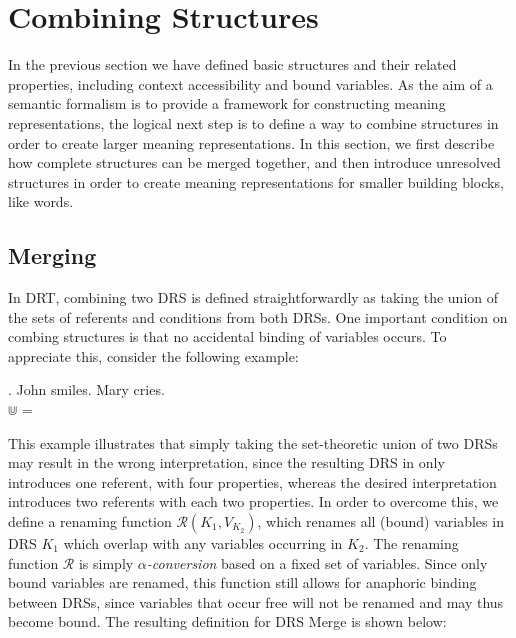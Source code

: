 \section{Combining Structures}\label{sec:combining}

In the previous section we have defined basic structures and their related
properties, including context accessibility and bound variables.  As the aim
of a semantic formalism is to provide a framework for constructing meaning
representations, the logical next step is to define a way to combine
structures in order to create larger meaning representations. In this
section, we first describe how complete structures can be merged together,
and then introduce unresolved structures in order to create meaning
representations for smaller building blocks, like words.

\subsection{Merging}

In DRT, combining two DRS is defined straightforwardly as taking the union
of the sets of referents and conditions from both DRSs. One important
condition on combing structures is that no accidental binding of variables
occurs. To appreciate this, consider the following example:

\ex. John smiles. Mary cries.\\
   $\Cup$  = 

\noindent This example illustrates that simply taking the set-theoretic
union of two DRSs may result in the wrong interpretation, since the
resulting DRS in \Last only introduces one referent, with four properties,
whereas the desired interpretation introduces two referents with each two
properties. In order to overcome this, we define a renaming function
$\mathcal{R}(K_1,V_{K_2})$, which renames all (bound) variables in DRS $K_1$
which overlap with any variables occurring in $K_2$. The renaming function
$\mathcal{R}$ is simply \textit{$\alpha$-conversion} based on a fixed set of
variables.  Since only bound variables are renamed, this function still
allows for anaphoric binding between DRSs, since variables that occur free
will not be renamed and may thus become bound. The resulting definition for
DRS Merge is shown below:


